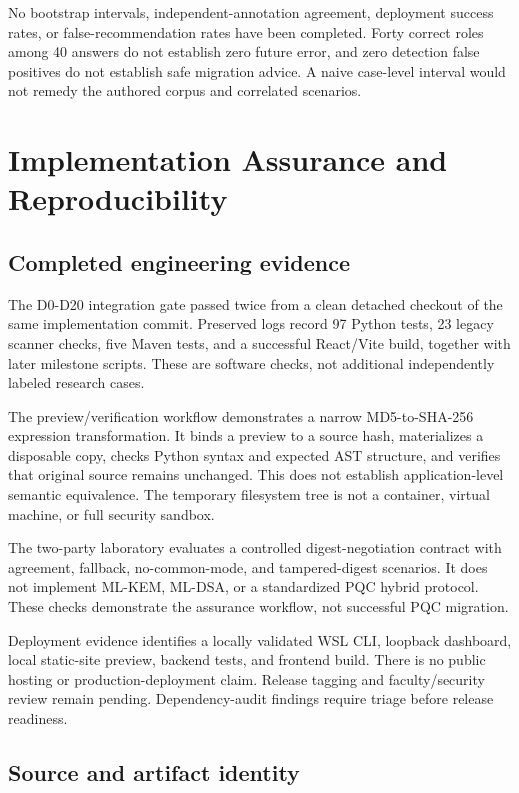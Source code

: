 \documentclass[conference,a4paper]{IEEEtran}
\begin{document}
No bootstrap intervals, independent-annotation agreement, deployment success rates, or false-recommendation rates have been completed. Forty correct roles among 40 answers do not establish zero future error, and zero detection false positives do not establish safe migration advice. A naive case-level interval would not remedy the authored corpus and correlated scenarios.

\section{Implementation Assurance and Reproducibility}

\subsection{Completed engineering evidence}

The D0-D20 integration gate passed twice from a clean detached checkout of the same implementation commit. Preserved logs record 97 Python tests, 23 legacy scanner checks, five Maven tests, and a successful React/Vite build, together with later milestone scripts. These are software checks, not additional independently labeled research cases.

The preview/verification workflow demonstrates a narrow MD5-to-SHA-256 expression transformation. It binds a preview to a source hash, materializes a disposable copy, checks Python syntax and expected AST structure, and verifies that original source remains unchanged. This does not establish application-level semantic equivalence. The temporary filesystem tree is not a container, virtual machine, or full security sandbox.

The two-party laboratory evaluates a controlled digest-negotiation contract with agreement, fallback, no-common-mode, and tampered-digest scenarios. It does not implement ML-KEM, ML-DSA, or a standardized PQC hybrid protocol. These checks demonstrate the assurance workflow, not successful PQC migration.

Deployment evidence identifies a locally validated WSL CLI, loopback dashboard, local static-site preview, backend tests, and frontend build. There is no public hosting or production-deployment claim. Release tagging and faculty/security review remain pending. Dependency-audit findings require triage before release readiness.

\subsection{Source and artifact identity}
\end{document}
